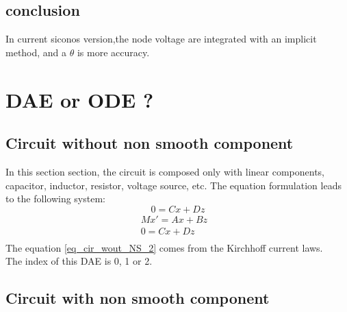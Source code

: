 \subsection{conclusion}
In current siconos version,the node voltage are integrated with an implicit method, and a $\theta$
is more accuracy.


\section{ DAE or ODE ?}

\subsection{Circuit without non smooth component}
In this section section, the circuit is composed only with linear components, capacitor, inductor,
resistor, voltage source, etc. The equation formulation leads to the following system:
\[ \]
\[0 = Cx + Dz \]
 \begin{eqnarray}
Mx'=Ax + Bz&\label{eq_cir_wout_NS_1}\\
0=Cx+ Dz &\label{eq_cir_wout_NS_2}\\
\end{eqnarray}
The equation \ref{eq_cir_wout_NS_2} comes from the Kirchhoff current laws.\\

The index of this DAE is 0, 1 or 2.
\subsection{Circuit with non smooth component}

